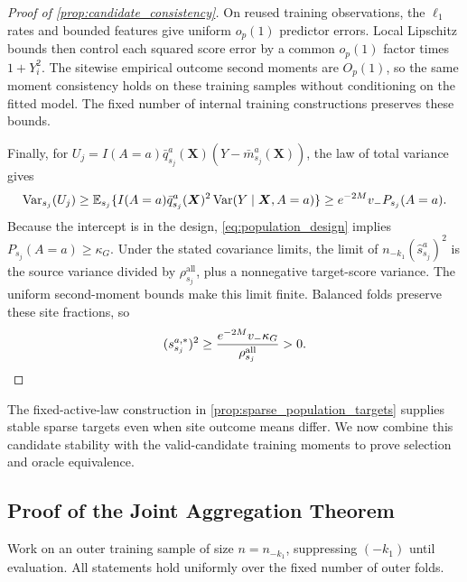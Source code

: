 \documentclass[12pt]{article}
\begin{document}
\begin{proof}[Proof of \cref{prop:candidate_consistency}]
On reused training observations, the $\ell_1$ rates and bounded features give uniform $o_p(1)$ predictor errors. Local Lipschitz bounds then control each squared score error by a common $o_p(1)$ factor times $1+Y_i^2$. The sitewise empirical outcome second moments are $O_p(1)$, so the same moment consistency holds on these training samples without conditioning on the fitted model. The fixed number of internal training constructions preserves these bounds.

Finally, for $U_j=I(A=a)\bar q_{s_j}^a(\boldsymbol X)(Y-\bar m_{s_j}^a(\boldsymbol X))$, the law of total variance gives
\[
\operatorname{Var}_{s_j}(U_j)
\ge\mathbb{E}_{s_j}\{I(A=a)\bar q_{s_j}^a(\boldsymbol X)^2\operatorname{Var}(Y\mid\boldsymbol X,A=a)\}
\ge e^{-2M}v_-P_{s_j}(A=a).
\]
Because the intercept is in the design, \cref{eq:population_design} implies $P_{s_j}(A=a)\ge\kappa_G$. Under the stated covariance limits, the limit of $n_{-k_1}(\widehat s_{s_j}^a)^2$ is the source variance divided by $\rho_{s_j}^{\mathrm{all}}$, plus a nonnegative target-score variance. The uniform second-moment bounds make this limit finite. Balanced folds preserve these site fractions, so
\[
(s_{s_j}^{a,*})^2
\ge\frac{e^{-2M}v_-\kappa_G}{\rho_{s_j}^{\mathrm{all}}}>0.\qedhere
\]
\end{proof}

The fixed-active-law construction in \cref{prop:sparse_population_targets} supplies stable sparse targets even when site outcome means differ. We now combine this candidate stability with the valid-candidate training moments to prove selection and oracle equivalence.

\subsection{Proof of the Joint Aggregation Theorem}\label{supp:joint_aggregation_proof}

Work on an outer training sample of size $n=n_{-k_1}$, suppressing $(-k_1)$ until evaluation. All statements hold uniformly over the fixed number of outer folds.
\end{document}
